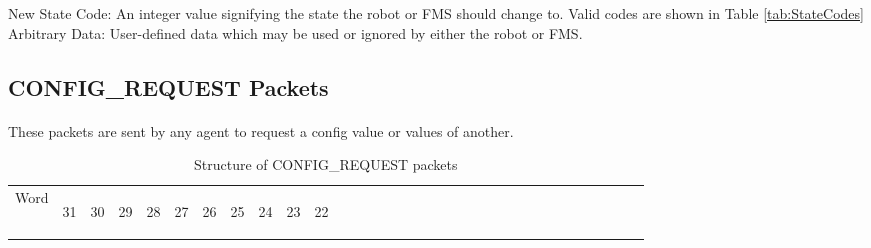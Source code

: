 \documentclass[11pt]{article}
\begin{document}
New State Code: An integer value signifying the state the robot or FMS should change to.
Valid codes are shown in Table \ref{tab:StateCodes}\\
Arbitrary Data: User-defined data which may be used or ignored by either the robot or FMS.

\subsection {CONFIG\_REQUEST Packets}
\paragraph{}
These packets are sent by any agent to request a config value or values of another.
\newline
\begin{table}[h!]
    \centering
    \caption{Structure of CONFIG\_REQUEST packets}
    \label{tab:configRequestDef}
    \begin{tabular}{|p{1cm}|m{0.04cm}|m{0.04cm}|m{0.04cm}|m{0.04cm}|m{0.04cm}|m{0.04cm}|m{0.04cm}|m{0.04cm}|m{0.04cm}|
        m{0.04cm}|m{0.04cm}|m{0.04cm}|m{0.04cm}|m{0.04cm}|m{0.04cm}|m{0.04cm}|m{0.04cm}|m{0.04cm}|m{0.04cm}|m{0.04cm}|
        m{0.04cm}|m{0.04cm}|m{0.04cm}|m{0.04cm}|m{0.04cm}|m{0.04cm}|m{0.04cm}|m{0.04cm}|m{0.04cm}|m{0.04cm}|m{0.04cm}|m{0.04cm}|}
        \hline
        Word & 
        \begin{sideways}31\end{sideways} &
        \begin{sideways}30\end{sideways} & 
        \begin{sideways}29\end{sideways} &
        \begin{sideways}28\end{sideways} &
        \begin{sideways}27\end{sideways} &
        \begin{sideways}26\end{sideways} &
        \begin{sideways}25\end{sideways} &
        \begin{sideways}24\end{sideways} &
        \begin{sideways}23\end{sideways} &
        \begin{sideways}22\end{sideways} &

\end{tabular}
\end{table}
\end{document}
